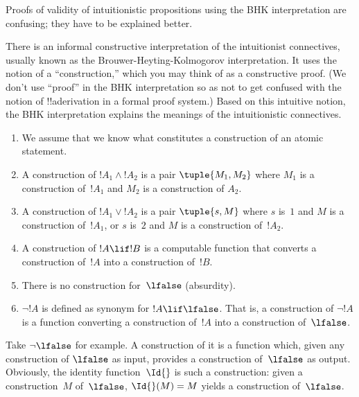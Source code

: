 \documentclass[../../../include/open-logic-section]{subfiles}
\begin{document}


\begin{editorial}
  Proofs of validity of intuitionistic propositions using the BHK
  interpretation are confusing; they have to be explained better.
\end{editorial}

There is an informal constructive interpretation of the intuitionist
connectives, usually known as the Brouwer-Heyting-Kolmogorov
interpretation. It uses the notion of a ``construction,'' which you
may think of as a constructive proof. (We don't use ``proof'' in the
BHK interpretation so as not to get confused with the notion of
!!a{derivation} in a formal proof system.) Based on this intuitive
notion, the BHK interpretation explains the meanings of the
intuitionistic connectives.

\begin{enumerate}
\item We assume that we know what constitutes a construction of an atomic
  statement.
\item A construction of $!A_1 \land !A_2$ is a pair $\tuple{M_1, M_2}$
  where $M_1$ is a construction of~$!A_1$ and $M_2$ is a construction
  of $A_2$.
\item A construction of $!A_1 \lor !A_2$ is a pair $\tuple{s, M}$
  where $s$ is~$1$ and $M$ is a construction of~$!A_1$, or $s$ is~$2$
  and $M$ is a construction of~$!A_2$.
\item A construction of $!A \lif !B$ is a computable function that converts a
  construction of~$!A$ into a construction of~$!B$.
\item There is no construction for~$\lfalse$ (absurdity).
\item $\lnot !A$ is defined as synonym for $!A \lif \lfalse$. That is,
  a construction of $\lnot !A$ is a function converting a construction
  of~$!A$ into a construction of~$\lfalse$.
\end{enumerate}

\begin{ex}
Take $\lnot \lfalse$ for example. A construction of it is a function
which, given any construction of $\lfalse$ as input, provides a
construction of~$\lfalse$ as output. Obviously, the identity
function~$\Id{}$ is such a construction: given a construction~$M$
of~$\lfalse$, $\Id{}(M) = M$ yields a construction of~$\lfalse$.
\end{ex}
\end{document}
